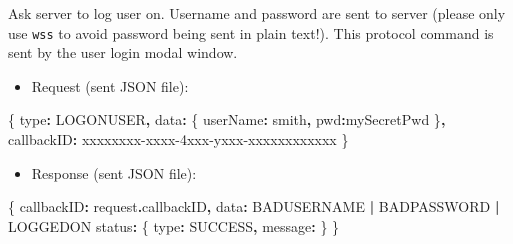 \documentclass[
]{book}
\newenvironment{Shaded}{\begin{snugshade}}{\end{snugshade}}
\newcommand{\AttributeTok}[1]{\textcolor[rgb]{0.77,0.63,0.00}{#1}}
\newcommand{\NormalTok}[1]{#1}
\newcommand{\OperatorTok}[1]{\textcolor[rgb]{0.81,0.36,0.00}{\textbf{#1}}}
\newcommand{\StringTok}[1]{\textcolor[rgb]{0.31,0.60,0.02}{#1}}
\providecommand{\tightlist}{%
  \setlength{\itemsep}{0pt}\setlength{\parskip}{0pt}}
\begin{document}
Ask server to log user on. Username and password are sent to server (please only use \texttt{wss} to avoid password being sent in plain text!). This protocol command is sent by the user login modal window.

\begin{itemize}
\tightlist
\item
  Request (sent JSON file):
\end{itemize}

\begin{Shaded}
\begin{Highlighting}[]
\NormalTok{\{}
  \StringTok{\textquotesingle{}type\textquotesingle{}}\OperatorTok{:} \StringTok{\textquotesingle{}LOGONUSER\textquotesingle{}}\OperatorTok{,}
  \StringTok{\textquotesingle{}data\textquotesingle{}}\OperatorTok{:}\NormalTok{ \{}
    \StringTok{\textquotesingle{}userName\textquotesingle{}}\OperatorTok{:} \StringTok{\textquotesingle{}smith\textquotesingle{}}\OperatorTok{,}
    \StringTok{\textquotesingle{}pwd\textquotesingle{}}\OperatorTok{:}\StringTok{\textquotesingle{}mySecretPwd\textquotesingle{}}
\NormalTok{  \}}\OperatorTok{,}
  \StringTok{\textquotesingle{}callbackID\textquotesingle{}}\OperatorTok{:} \StringTok{\textquotesingle{}xxxxxxxx{-}xxxx{-}4xxx{-}yxxx{-}xxxxxxxxxxxx\textquotesingle{}}
\NormalTok{\}}
\end{Highlighting}
\end{Shaded}

\begin{itemize}
\tightlist
\item
  Response (sent JSON file):
\end{itemize}

\begin{Shaded}
\begin{Highlighting}[]
\NormalTok{\{}
  \StringTok{\textquotesingle{}callbackID\textquotesingle{}}\OperatorTok{:}\NormalTok{ request}\OperatorTok{.}\AttributeTok{callbackID}\OperatorTok{,}
  \StringTok{\textquotesingle{}data\textquotesingle{}}\OperatorTok{:} \StringTok{\textquotesingle{}BADUSERNAME\textquotesingle{}} \OperatorTok{|} \StringTok{\textquotesingle{}BADPASSWORD\textquotesingle{}} \OperatorTok{|} \StringTok{\textquotesingle{}LOGGEDON\textquotesingle{}}
  \StringTok{\textquotesingle{}status\textquotesingle{}}\OperatorTok{:}\NormalTok{ \{}
    \StringTok{\textquotesingle{}type\textquotesingle{}}\OperatorTok{:} \StringTok{\textquotesingle{}SUCCESS\textquotesingle{}}\OperatorTok{,}
    \StringTok{\textquotesingle{}message\textquotesingle{}}\OperatorTok{:} \StringTok{\textquotesingle{}\textquotesingle{}}
\NormalTok{  \}}
\NormalTok{\}}
\end{Highlighting}
\end{Shaded}
\end{document}
